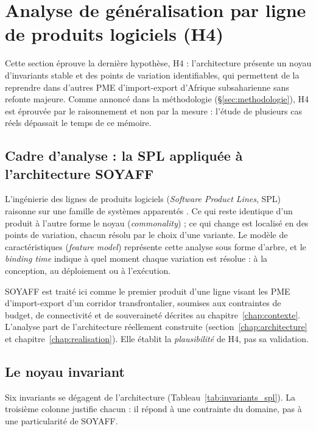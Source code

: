 \section{Analyse de généralisation par ligne de produits logiciels (H4)}
\label{chap:generalisation_spl}

Cette section éprouve la dernière hypothèse, H4 : l'architecture présente un noyau d'invariants stable et des points de variation identifiables, qui permettent de la reprendre dans d'autres PME d'import-export d'Afrique subsaharienne sans refonte majeure. Comme annoncé dans la méthodologie (\S\ref{sec:methodologie}), H4 est éprouvée par le raisonnement et non par la mesure : l'étude de plusieurs cas réels dépassait le temps de ce mémoire.

\subsection{Cadre d'analyse : la SPL appliquée à l'architecture SOYAFF}
\label{sec:spl_cadre}

L'ingénierie des lignes de produits logiciels (\textit{Software Product Lines}, SPL) raisonne sur une famille de systèmes apparentés \cite{clementsSoftwareProductLines2002,fix_pohlSoftwareProductLines2018,apelSoftwareProductLines2013}. Ce qui reste identique d'un produit à l'autre forme le noyau (\textit{commonality}) ; ce qui change est localisé en des points de variation, chacun résolu par le choix d'une variante. Le modèle de caractéristiques (\textit{feature model}) représente cette analyse sous forme d'arbre, et le \textit{binding time} indique à quel moment chaque variation est résolue : à la conception, au déploiement ou à l'exécution.

SOYAFF est traité ici comme le premier produit d'une ligne visant les PME d'import-export d'un corridor transfrontalier, soumises aux contraintes de budget, de connectivité et de souveraineté décrites au chapitre~\ref{chap:contexte}. L'analyse part de l'architecture réellement construite (section~\ref{chap:architecture} et chapitre~\ref{chap:realisation}). Elle établit la \emph{plausibilité} de H4, pas sa validation.

\subsection{Le noyau invariant}
\label{sec:spl_invariants}

Six invariants se dégagent de l'architecture (Tableau~\ref{tab:invariants_spl}). La troisième colonne justifie chacun : il répond à une contrainte du domaine, pas à une particularité de SOYAFF.

